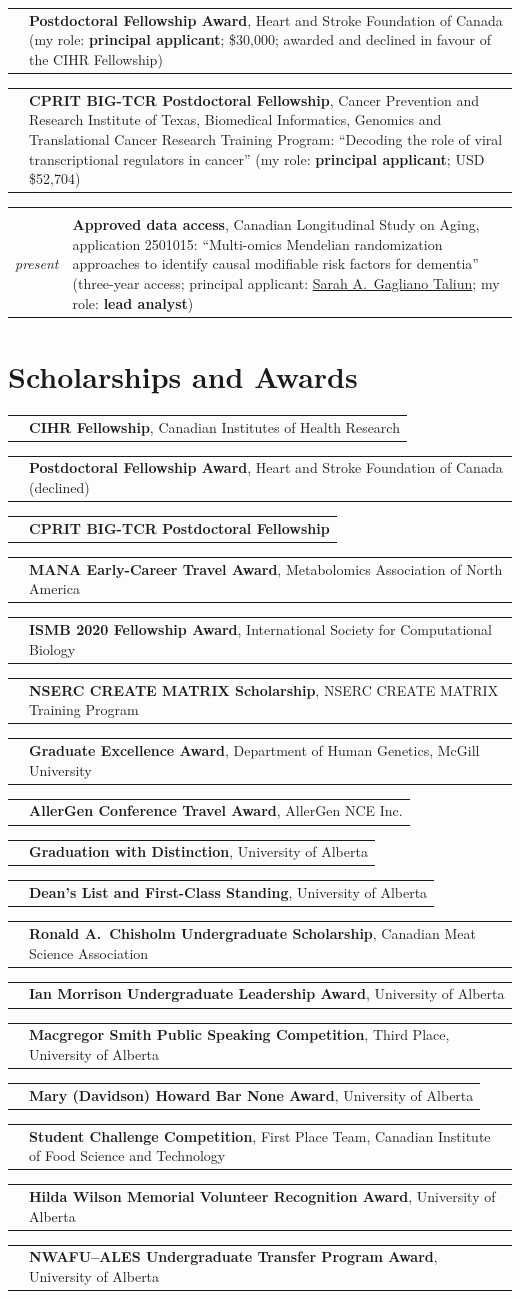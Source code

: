\documentclass[11pt,letterpaper,roman]{moderncv}   %
\makeatletter
\renewcommand*{\cvitem}[3][.25em]{%
  \begin{tabular}{@{}p{\hintscolumnwidth}@{\hspace{\separatorcolumnwidth}}p{\maincolumnwidth}@{}}%
    \raggedleft\hintstyle{#2} &{#3}%
  \end{tabular}%
  \par\addvspace{#1}}
\makeatother
\begin{document}
\cvitem{2025--2026}{\textbf{Postdoctoral Fellowship Award}, Heart and Stroke Foundation of Canada (my role: \textbf{principal applicant}; \$30,000; awarded and declined in favour of the CIHR Fellowship)}

\cvitem{2024}{\textbf{CPRIT BIG-TCR Postdoctoral Fellowship}, Cancer Prevention and Research Institute of Texas, Biomedical Informatics, Genomics and Translational Cancer Research Training Program: ``Decoding the role of viral transcriptional regulators in cancer'' (my role: \textbf{principal applicant}; USD \$52,704)}

\cvitem{2025--\\\textit{present}}{\textbf{Approved data access}, Canadian Longitudinal Study on Aging, application 2501015: ``Multi-omics Mendelian randomization approaches to identify causal modifiable risk factors for dementia'' (three-year access; principal applicant: \href{https://sgagliano.github.io/}{Sarah A.~Gagliano Taliun}; my role: \textbf{lead analyst})}

\section{Scholarships and Awards}
\cvitem{2025--2027}{\textbf{CIHR Fellowship}, Canadian Institutes of Health Research}
\cvitem{2025--2026}{\textbf{Postdoctoral Fellowship Award}, Heart and Stroke Foundation of Canada (declined)}
\cvitem{2024}{\textbf{CPRIT BIG-TCR Postdoctoral Fellowship}}
\cvitem{Sept. 2022}{\textbf{MANA Early-Career Travel Award}, Metabolomics Association of North America}
\cvitem{June 2020}{\textbf{ISMB 2020 Fellowship Award}, International Society for Computational Biology}
\cvitem{2019--2023}{\textbf{NSERC CREATE MATRIX Scholarship}, NSERC CREATE MATRIX Training Program}
\cvitem{May 2019}{\textbf{Graduate Excellence Award}, Department of Human Genetics, McGill University}
\cvitem{Jan. 2019}{\textbf{AllerGen Conference Travel Award}, AllerGen NCE Inc.}
\cvitem{June 2015}{\textbf{Graduation with Distinction}, University of Alberta}
\cvitem{2014, 2015}{\textbf{Dean's List and First-Class Standing}, University of Alberta}
\cvitem{May 2015}{\textbf{Ronald A.~Chisholm Undergraduate Scholarship}, Canadian Meat Science Association}
\cvitem{Jan. 2015}{\textbf{Ian Morrison Undergraduate Leadership Award}, University of Alberta}
\cvitem{Jan. 2015}{\textbf{Macgregor Smith Public Speaking Competition}, Third Place, University of Alberta}
\cvitem{Oct. 2014}{\textbf{Mary (Davidson) Howard Bar None Award}, University of Alberta}
\cvitem{Aug. 2014}{\textbf{Student Challenge Competition}, First Place Team, Canadian Institute of Food Science and Technology}
\cvitem{Feb. 2014}{\textbf{Hilda Wilson Memorial Volunteer Recognition Award}, University of Alberta}
\cvitem{May 2013}{\textbf{NWAFU--ALES Undergraduate Transfer Program Award}, University of Alberta}
\end{document}
